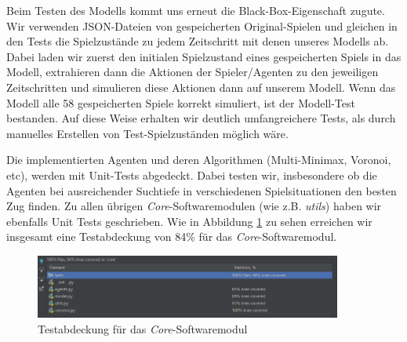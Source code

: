 Beim Testen des Modells kommt uns erneut die Black-Box-Eigenschaft zugute. Wir verwenden JSON-Dateien von gespeicherten Original-Spielen und gleichen in den Tests die Spielzustände zu jedem Zeitschritt mit denen unseres Modells ab. Dabei laden wir zuerst den initialen Spielzustand eines gespeicherten Spiels in das Modell, extrahieren dann die Aktionen der Spieler/Agenten zu den jeweiligen Zeitschritten und simulieren diese Aktionen dann auf unserem Modell. Wenn das Modell alle 58 gespeicherten Spiele korrekt simuliert, ist der Modell-Test bestanden. Auf diese Weise erhalten wir deutlich umfangreichere Tests, als durch manuelles Erstellen von Test-Spielzuständen möglich wäre.

Die implementierten Agenten und deren Algorithmen (Multi-Minimax, Voronoi, etc), werden mit Unit-Tests abgedeckt. Dabei testen wir, insbesondere ob die Agenten bei ausreichender Suchtiefe in verschiedenen Spielsituationen den besten Zug finden. Zu allen übrigen \textit{Core}-Softwaremodulen (wie z.B. \textit{utils}) haben wir ebenfalls Unit Tests geschrieben. Wie in Abbildung \ref{fig:coverage} zu sehen erreichen wir insgesamt eine Testabdeckung von 84\% für das \textit{Core}-Softwaremodul.

\begin{figure}[ht]
    \centering
    \includegraphics[width=0.9\textwidth]{img/coverage.PNG}
    \caption{Testabdeckung für das \textit{Core}-Softwaremodul}
	\label{fig:coverage}
\end{figure}